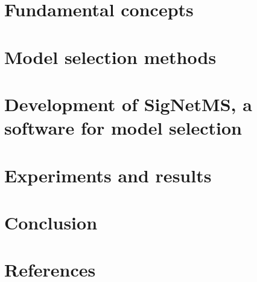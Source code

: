 \documentclass[12pt, twoside, bibliography=totoc]{report}
\numberwithin{mydefinition}{section}
\numberwithin{mytheorem}{section}
\numberwithin{mylemma}{section}
\numberwithin{corollary}{section}
\begin{document}
\chapter{Fundamental concepts}
\label{chap:fundamental_concepts}


\chapter{Model selection methods}
\label{chap:model_selection}


\chapter{Development of SigNetMS, a software for model selection}
\label{chap:development_signetms}


\chapter{Experiments and results}
\label{chap:experiments}


\chapter{Conclusion}
\label{chap:conclusion}


\newpage
\chapter*{References}
\printbibliography[heading=none]
\end{document}
